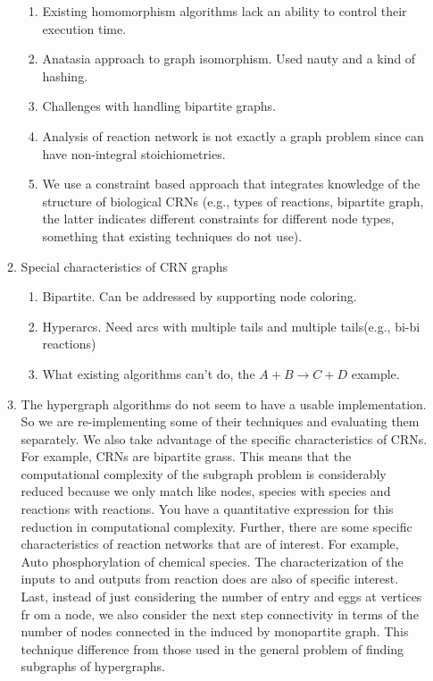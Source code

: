 \documentclass{article}
\begin{document}
\begin{enumerate}
\begin{enumerate}
\begin{enumerate}
            \item Existing homomorphism algorithms lack an ability to control their execution time.
        \item Anatasia approach to graph isomorphism. Used nauty and a kind of hashing.
        \item Challenges with handling bipartite graphs.
        \item Analysis of reaction network is not exactly a graph problem since can have non-integral stoichiometries.
        \item We use a constraint based approach that integrates knowledge of the structure of biological CRNs (e.g., types of reactions, bipartite graph, the latter indicates different constraints for different node types, something that existing techniques do not use).
        \end{enumerate}
        \item Special characteristics of CRN graphs
        \begin{enumerate}
            \item Bipartite. Can be addressed by supporting node coloring.
            \item Hyperarcs. Need arcs with multiple tails and multiple tails(e.g., bi-bi reactions)
            \item What existing algorithms can't do, the $A + B \rightarrow C + D$ example.
        \end{enumerate}
    \item The hypergraph algorithms do not seem to have a usable implementation. So we are re-implementing some of their techniques and evaluating them separately. We also take advantage of the specific characteristics of CRNs. For example, CRNs are bipartite grass. This means that the computational complexity of the subgraph problem is considerably reduced because we only match like nodes, species with species and reactions with reactions. You have a quantitative expression for this reduction in computational complexity. Further, there are some specific characteristics of reaction networks that are of interest. For example, Auto phosphorylation of chemical species. The characterization of the inputs to and outputs from reaction does are also of specific interest. Last, instead of just considering the number of entry and eggs at vertices fr    om a node, we also consider the next step connectivity in terms of the number of nodes connected in the induced by monopartite graph. This technique difference from those used in the general problem of finding subgraphs of hypergraphs.
    \end{enumerate}


\end{enumerate}
\end{document}
